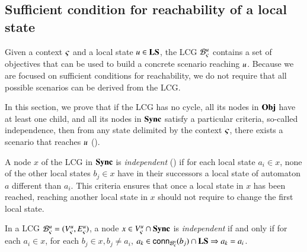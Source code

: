 

\subsection{Sufficient condition for reachability of a local state}
\label{ssec:ua}

Given a context $\varsigma$ and a local state $u\in\mathbf{LS}$, the LCG ${\mathcal{B}_{\varsigma}^{u}}$ contains a set of objectives
that can be used to build a concrete scenario reaching $u$.
Because we are focused on sufficient conditions for reachability, we do not require that all
possible scenarios can be derived from the LCG.

In this section, we prove that if the LCG has no cycle, all its nodes in $\mathbf{Obj}$ have at least one
child, and all its nodes in $\mathbf{Sync}$ satisfy a
particular criteria, so-called independence, then from any state
delimited by the context $\varsigma$, there exists a scenario that reaches $u$
().

A node $x$ of the LCG in $\mathbf{Sync}$ is \emph{independent} () if for each local state
$a_i\in x$, none of the other local states $b_j\in x$ have in their successors a local state of automaton $a$ different
than $a_i$.
This criteria ensures that once a local state in $x$ has been reached, reaching another local state
in $x$ should not require to change the first local state.

\begin{definition}
\label{def:coherent}
  In a LCG ${\mathcal{B}_{\varsigma}^{u}} = ({V_\varsigma^u}, {E_\varsigma^u})$,
  a node $x \in {V_\varsigma^u}\cap\mathbf{Sync}$ is \emph{independent} if and only if
  for each $a_i\in x$,
  for each $b_j\in x, b_j\neq a_i$,
  $a_k \in\mathsf{conn}_{{\mathcal{B}_{\varsigma}^{u}}}(b_j) \cap \mathbf{LS} \Rightarrow a_k = a_i$.
\end{definition}

